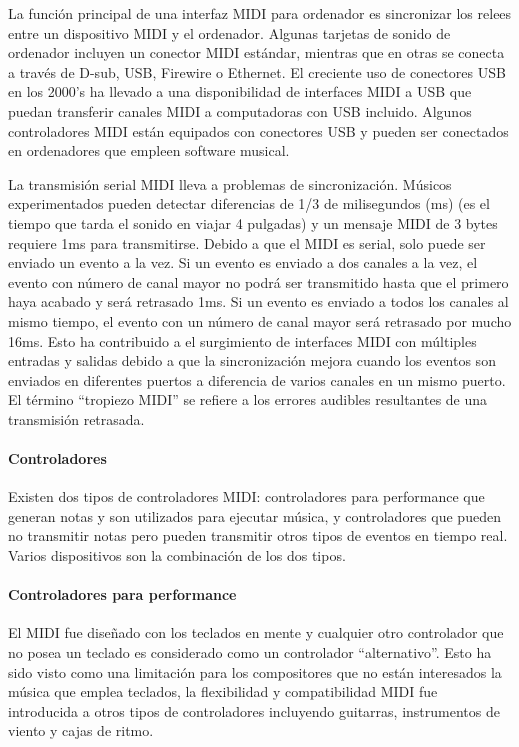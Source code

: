 \documentclass[a4paper,11pt,oneside]{book}
\begin{document}
La función principal de una interfaz MIDI para ordenador es sincronizar los relees entre un dispositivo MIDI y el ordenador. Algunas tarjetas de sonido de ordenador incluyen un conector MIDI estándar, mientras que en otras se conecta a través de D-sub, USB, Firewire o Ethernet. El creciente uso de conectores USB en los 2000's ha llevado a una disponibilidad de interfaces MIDI a USB que puedan transferir canales MIDI a computadoras con USB incluido. Algunos controladores MIDI están equipados con conectores USB y pueden ser conectados en ordenadores que empleen software musical.

La transmisión serial MIDI lleva a problemas de sincronización. Músicos experimentados pueden detectar diferencias de 1/3 de milisegundos (ms) (es el tiempo que tarda el sonido en viajar 4 pulgadas) y un mensaje MIDI de 3 bytes requiere 1ms para transmitirse. Debido a que el MIDI es serial, solo puede ser enviado un evento a la vez. Si un evento es enviado a dos canales a la vez, el evento con número de canal mayor no podrá ser transmitido hasta que el primero haya acabado y será retrasado 1ms. Si un evento es enviado a todos los canales al mismo tiempo, el evento con un número de canal mayor será retrasado por mucho 16ms. Esto ha contribuido a el surgimiento de interfaces MIDI con múltiples entradas y salidas debido a que la sincronización mejora cuando los eventos son enviados en diferentes puertos a diferencia de varios canales en un mismo puerto. El término ``tropiezo MIDI'' se refiere a los errores audibles resultantes de una transmisión retrasada.

\paragraph{Controladores}

Existen dos tipos de controladores MIDI: controladores para performance que generan notas y son utilizados para ejecutar música, y controladores que pueden no transmitir notas pero pueden transmitir otros tipos de eventos en tiempo real. Varios dispositivos son la combinación de los dos tipos.


\paragraph{Controladores para performance}


El MIDI fue diseñado con los teclados en mente y cualquier otro controlador que no posea un teclado es considerado como un controlador ``alternativo''. Esto ha sido visto como una limitación para los compositores que no están interesados la música que emplea teclados, la flexibilidad y compatibilidad MIDI fue introducida a otros tipos de controladores incluyendo guitarras, instrumentos de viento y cajas de ritmo.
\end{document}
